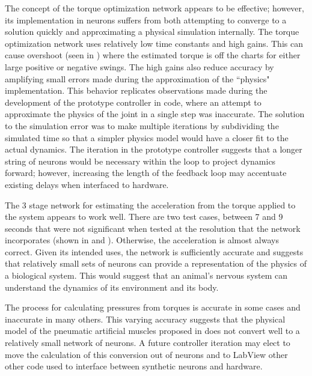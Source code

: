 The concept of the torque optimization network appears to be effective; however,
its implementation in neurons suffers from both attempting to converge to a
solution quickly and approximating a physical simulation internally. The torque optimization network
uses relatively low time constants and high gains. This can cause overshoot
(seen in ) where the
estimated torque is off the charts for either large positive or negative swings.
The high gains also reduce accuracy by amplifying small errors made during the
approximation of the ``physics" implementation. This behavior replicates
observations made during the development of the prototype controller in code,
where an attempt to approximate the physics of the joint in a single step was
inaccurate. The solution to the simulation error was to make multiple iterations by subdividing
the simulated time so that a simpler physics model would have a closer fit to
the actual dynamics. The iteration in the prototype controller suggests that a longer string of neurons would be
necessary within the loop to project dynamics forward; however, increasing the length of the feedback loop may accentuate existing delays when interfaced to hardware.


The 3 stage network for estimating the acceleration from the torque applied to
the system appears to work well. There are two test cases, between 7 and 9
seconds that were not significant when tested at the resolution that the
network incorporates (shown in  and ). Otherwise, the acceleration is almost always correct.
Given its intended uses, the network is sufficiently accurate and suggests that
relatively small sets of neurons can provide a representation of the physics of
a biological system. This would suggest that an animal's nervous system can understand the dynamics of its environment and its body.


The process for calculating pressures from torques is accurate in some
cases and inaccurate in many others. This varying accuracy suggests that the physical
model of the pneumatic artificial muscles proposed in \cite{HuntPMuscles}
does not convert well to a relatively small network of neurons. A future controller iteration may elect to move the
calculation of this conversion out of neurons and
to LabView other other code used to interface between synthetic neurons and
hardware.

